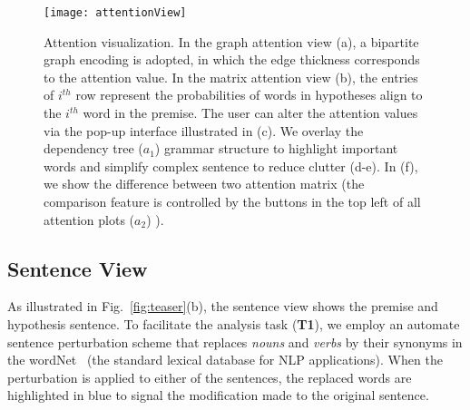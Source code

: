 \begin{figure*}[htbp]
\centering
\vspace{-2mm}
\texttt{[image: attentionView]}
\vspace{-6mm}
\caption{
Attention visualization. In the graph attention view (a), a bipartite graph encoding is adopted, in which the edge thickness corresponds to the attention value. In the matrix attention view (b), the entries of $i^{th}$ row represent the probabilities of words in hypotheses align to the $i^{th}$ word in the premise.
The user can alter the attention values via the pop-up interface illustrated in (c).
We overlay the dependency tree ($a_1$) grammar structure to highlight important words and simplify complex sentence to reduce clutter (d-e).
In (f), we show the difference between two attention matrix (the comparison feature is controlled by the buttons in the top left of all attention plots ($a_2$) ).
}
\label{fig:attentionVis}
\vspace{-4mm}
\end{figure*}

\subsection{Sentence View}
\label{sec:sentence}
As illustrated in Fig.~\ref{fig:teaser}(b), the sentence view shows the premise and hypothesis sentence.
%
To facilitate the analysis task (\textbf{T1}), we employ an automate sentence perturbation scheme that replaces \emph{nouns} and \emph{verbs} by their synonyms in the wordNet~\cite{Miller1995} (the standard lexical database for NLP applications).
%
When the perturbation is applied to either of the sentences, the replaced words are highlighted in blue to signal the modification made to the original sentence.



